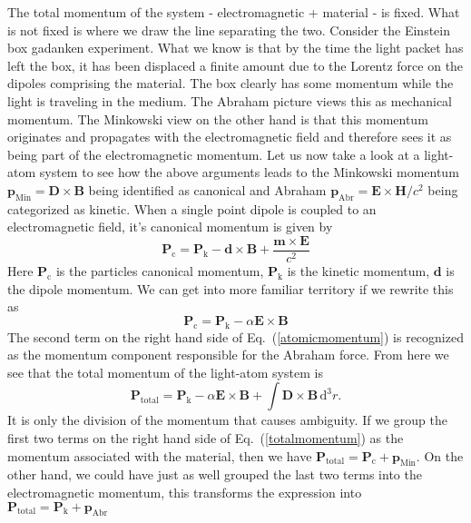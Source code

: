 \documentclass[twocolumn,english,pra,aps,superscriptaddress,floatfix]{revtex4-1}
\begin{document}
The total momentum of the system - electromagnetic + material -  is fixed.  What is not fixed is where we draw the line separating the two.  Consider the Einstein box gadanken experiment. What we know is that by the time the light packet has left the box, it has been displaced a finite amount due to the Lorentz force on the dipoles comprising the material.  The box clearly has some momentum while the light is traveling in the medium.  The Abraham picture views this as mechanical momentum.  The Minkowski view on the other hand is that this momentum originates and propagates with the electromagnetic field and therefore sees it as being part of the electromagnetic momentum.  
Let us now take a look at a light-atom system to see how the above arguments leads to the Minkowski momentum $\mathbf{p}_{\mathrm{Min}}=\mathbf{D}\times\mathbf{B}$ being identified as canonical and Abraham $\mathbf{p}_{\mathrm{Abr}}=\mathbf{E}\times\mathbf{H}/c^2$ being categorized as kinetic.  When a single point dipole is coupled to an electromagnetic field, it's canonical momentum is given by
\begin{equation}
\mathbf{P}_\mathrm{c}=\mathbf{P}_\mathrm{k} - \mathbf{d}\times\mathbf{B} + \frac{\mathbf{m}\times\mathbf{E}}{c^2}
\end{equation}
Here $\mathbf{P}_\mathrm{c}$ is the particles canonical momentum, $\mathbf{P}_\mathrm{k}$ is the kinetic momentum, $\mathbf{d}$ is the dipole momentum. We can get into more familiar territory if we rewrite this as
\begin{equation}
\mathbf{P}_\mathrm{c}=\mathbf{P}_\mathrm{k} - \alpha\mathbf{E}\times\mathbf{B}
\label{atomicmomentum}
\end{equation}
The second term on the right hand side of Eq.\ (\ref{atomicmomentum}) is recognized as the momentum component responsible for the Abraham force.  From here we see that the total momentum of the light-atom system is 
\begin{equation}
\mathbf{P}_{\mathrm{total}}=\mathbf{P}_{\mathrm{k}}-\alpha\mathbf{E}\times\mathbf{B} + \int \! \mathbf{D}\times\mathbf{B} \, \mathrm{d}^3r.
\label{totalmomentum}
\end{equation}
It is only the division of the momentum that causes ambiguity.  If we group the first two terms on the right hand side of Eq.\ (\ref{totalmomentum}) as the momentum associated with the material, then we have $\mathbf{P}_{\mathrm{total}}=\mathbf{P}_{\mathrm{c}}+\mathbf{p}_{\mathrm{Min}}$.  On the other hand, we could have just as well grouped the last two terms into the electromagnetic momentum, this transforms the expression into $\mathbf{P}_{\mathrm{total}}=\mathbf{P}_{\mathrm{k}}+\mathbf{p}_{\mathrm{Abr}}$
\end{document}
